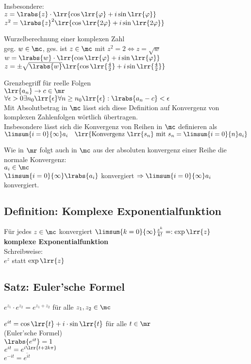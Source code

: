			Insbesondere:\\
			$z=\lrabs{z}\cdot\lrr{\cos\lrr{\varphi}+i\sin\lrr{\varphi}}$\\
			$z^2=\lrabs{z}^2\lrr{\cos\lrr{2\varphi}+i\sin\lrr{2\varphi}}$
		\item Wurzelberechnung einer komplexen Zahl\\
			geg. $w\in\mc$, ges. ist $z\in\mc$ mit $z^2=2\Leftrightarrow z=\sqrt{w}$\\
			$w=\lrabs{w}\cdot\lrr{\cos\lrr{\varphi}+i\sin\lrr{\varphi}}$\\
			$z=\pm\sqrt{\lrabs{w}}\lrr{\cos\lrr{\frac{4}{2}}+i\sin\lrr{\frac{4}{2}}}$

			Grenzbegriff für reelle Folgen\\
			$\lrr{a_n}\rightarrow c\in\mr$\\
			$\forall\epsilon >0\exists n_0\lrr{\epsilon}\forall n\geq n_0\lrr{\epsilon}:\lrabs{a_n-c}<\epsilon$\\
			Mit Absolutbetrag in $\mc$ lässt sich diese Definition auf Konvergenz von komplexen Zahlenfolgen wörtlich übertragen.\\
			Insbesondere lässt sich die Konvergenz von Reihen in $\mc$ definieren als\\
			$\limsum{i=0}{\infty}a_i\quad\lrr{\mbox{Konvergenz } \lrr{s_n} \mbox{ mit } s_n=\limsum{i=0}{n}a_i}$

			Wie in $\mr$ folgt auch in $\mc$ aus der absoluten konvergenz einer Reihe die normale Konvergenz:\\
			$a_i\in\mc$\\
			$\limsum{i=0}{\infty}\lrabs{a_i}$ konvergiert $\Rightarrow \limsum{i=0}{\infty}a_i$ konvergiert.
	\subExEnd

\subsection{Definition: Komplexe Exponentialfunktion}
	Für jedes $z\in\mc$ konvergiert $\limsum{k=0}{\infty}\frac{z^k}{k!}=:\exp\lrr{z}$\\
	\textbf{komplexe Exponentialfunktion}\\
	Schreibweise:\\
	$e^z$ statt $\exp\lrr{z}$

\subsection{Satz: Euler'sche Formel}
		\item $e^{z_1}\cdot e^{z_2}=e^{z_1+z_2}$ für alle $z_1,z_2\in\mc$
		\item $e^{it}=\cos\lrr{t}+i\cdot\sin\lrr{t}$ für alle $t\in\mr$\\
			(Euler'sche Formel)\\
			$\lrabs{e^{it}}=1$\\
			$e^{it}=e^{i\lrr{t+2k\pi}}$\\
			$e^{-it}=\overline{e^{it}}$

